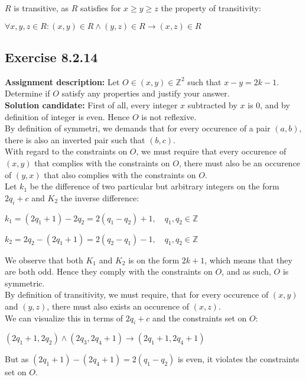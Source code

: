 \documentclass{report}
\newcommand{\cent}[1]{\begin{center}#1\end{center}}
\newcommand{\doubleZ}{\mathbb{Z}}
\newcommand{\In}{\! \in \!}
\newcommand{\AssignmentDescription}{\textbf{Assignment description: }}
\newcommand{\Solution}{\textbf{Solution candidate: }}
\newcommand{\Exercise}[1]{\subsection{Exercise #1}}
\begin{document}
	 $R$ is transitive, as $R$ satisfies for $x \geq y \geq z$ the property of transitivity:
	 
	 \cent{$\forall x,y,z \In R : (x,y) \In R  \wedge (y,z) \In R \to (x,z) \In R$}
	 
	 \Exercise{8.2.14}
	 
	 \AssignmentDescription
	 Let $O\In (x,y) \In \doubleZ^2$ such that $x-y = 2k-1$. Determine if $O$ satisfy any properties and justify your answer.\\
	 
	 \Solution
	 First of all, every integer $x$ subtracted by $x$ is 0, and by definition of integer is even. Hence $O$ is not reflexive.\\
	 
	 By definition of symmetri, we demands that for every occurence of a pair $(a,b)$, there is also an inverted pair such that $(b,c)$.\\ 
	 
	 With regard to the constraints on $O$, we must require that every occurence of $(x,y)$ that complies with the constraints on $O$, there must also be an occurence of $(y,x)$ that also complies with the constraints on $O$.\\
	 
	 Let $k_1$ be the difference of two particular but arbitrary integers on the form $2q_i + c$ and $K_2$ the inverse difference:
	 
	 \cent{$k_1 = (2q_1+1) - 2q_2 = 2(q_1 - q_2) + 1, \quad q_1,q_2 \In \doubleZ$}
	 
	 \cent{$k_2 = 2q_2  - (2q_1 + 1) = 2(q_2 -q_1) - 1, \quad q_1,q_2 \In \doubleZ$}
	 
	 We observe that both $K_1$ and $K_2$ is on the form $2k +1$, which means that they are both odd. Hence they comply with the constraints on $O$, and as such, $O$ is symmetric.\\
	 
	 By definition of transitivity, we must require, that for every occurence of $(x,y)$ and $(y,z)$, there must also exists an occurence of $(x,z)$.\\
	 
	 We can visualize this in terms of $2q_i + c$ and the constraints set on $O$:
	 
	 \cent{$(2q_1+1,2q_2) \wedge (2q_3,2q_4 + 1) \to (2q_1 + 1, 2q_4+1)$}
	 
	 But as $(2q_1 + 1) - (2q_4 + 1) = 2(q_1 - q_2)$ is even, it violates the constraints set on $O$.\\ 
	 
\end{document}
